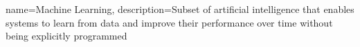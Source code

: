 {
    name=Machine Learning,
    description={Subset of artificial intelligence that enables systems to learn from data and improve their performance over time without being explicitly programmed}
}

